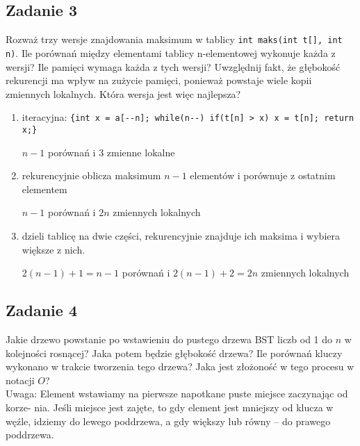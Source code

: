 \documentclass{article}
\begin{document}
\pagebreak
\subsection*{Zadanie 3}
Rozważ trzy wersje znajdowania maksimum w tablicy \verb|int maks(int t[], int n)|.
Ile porównań między elementami tablicy n-elementowej wykonuje każda z wersji? Ile
pamięci wymaga każda z tych wersji? Uwzględnij fakt, że głębokość rekurencji ma wpływ
na zużycie pamięci, ponieważ powstaje wiele kopii zmiennych lokalnych. Która wersja
jest więc najlepsza?
\begin{enumerate}[label=(\alph*)]
    \item iteracyjna: \verb|{int x = a[--n]; while(n--) if(t[n] > x) x = t[n]; return x;}|
          \begin{center}
              $n-1$ porównań i 3 zmienne lokalne
          \end{center}
    \item rekurencyjnie oblicza maksimum $n-1$ elementów i porównuje z ostatnim elementem
          \begin{center}
              $n-1$ porównań i $2n$ zmiennych lokalnych
          \end{center}
    \item dzieli tablicę na dwie części, rekurencyjnie znajduje ich maksima i wybiera większe z nich.
          \begin{center}
              $2(n-1)+1 = n-1$ porównań i $2(n-1) + 2 = 2n$ zmiennych lokalnych
          \end{center}
\end{enumerate}

\subsection*{Zadanie 4}
Jakie drzewo powstanie po wstawieniu do pustego drzewa BST liczb od 1 do $n$ w kolejności rosnącej?
Jaka potem będzie głębokość drzewa? Ile porównań kluczy wykonano w
trakcie tworzenia tego drzewa? Jaka jest złożoność w tego procesu w notacji $O$?
\smallskip \\
Uwaga: Element wstawiamy na pierwsze napotkane puste miejsce zaczynając od korze-
nia. Jeśli miejsce jest zajęte, to gdy element jest mniejszy od klucza w węźle, idziemy
do lewego poddrzewa, a gdy większy lub równy -- do prawego poddrzewa.
\end{document}
